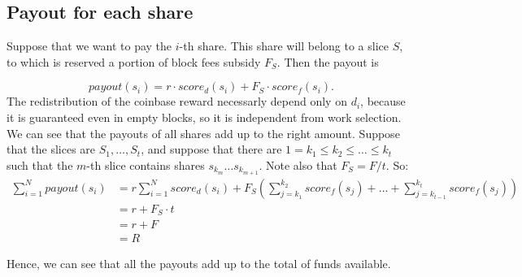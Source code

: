 \documentclass[11pt]{article} %
\begin{document}
\subsection{Payout for each share}
Suppose that we want to pay the $i$-th share. This share will belong to a slice $S$, to which is reserved a portion of block fees subsidy $F_S$. Then the payout is

\[payout(s_i) = r\cdot score_d(s_i) + F_S \cdot score_f(s_i).\]
 The redistribution of the coinbase reward necessarly depend only on $d_i$, because it is guaranteed even in empty blocks, so it is independent from work selection.
We can see that the payouts of all shares add up to the right amount. Suppose that the slices are $S_1, \dots, S_t$, and suppose that there are $1=k_1\le k_2\le \dots \le k_t$ such that the $m$-th slice contains shares $s_{k_m} \dots s_{k_{m+1}}$. Note also that $F_S = F/t$. So:
\begin{align*} 
\sum_{i=1} ^N payout(s_i) &= r\sum_{i=1}^N score_d(s_i) +F_{S}\left(\sum_{j=k_1}^{k_2} score_f(s_j)+\dots +\sum_{j=k_{t-1}}^{k_t} score_f(s_j)\right) \\
&= r +F_S\cdot t\\ &= r+F \\ &= R
\end{align*}

Hence, we can see that all the payouts add up to the total of funds available.
\end{document}
